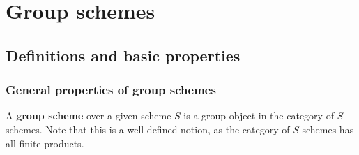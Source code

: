 \section{Group schemes}
    \subsection{Definitions and basic properties}
        \subsubsection{General properties of group schemes}
            \begin{definition} \label{def: group_schemes}
                A \textbf{group scheme} over a given scheme $S$ is a group object in the category of $S$-schemes. Note that this is a well-defined notion, as the category of $S$-schemes has all finite products.
                

\end{definition}
